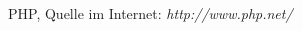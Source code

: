 \begin{thebibliography}{99}

PHP, Quelle im Internet: \textit{http://www.php.net/}

\end{thebibliography}
